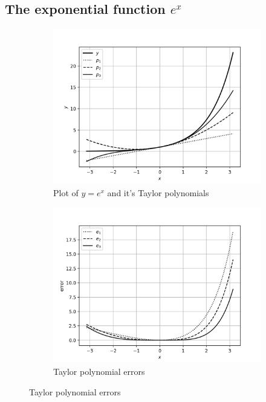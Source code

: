 \documentclass[12,a4paper]{article}
\begin{document}
    \subsection{The exponential function $e^x$}
    \begin{figure}[h!]
        \centering
        \begin{subfigure}[t]{0.49\textwidth}
            \includegraphics[width=\textwidth]{plots/q1p1.png}
            \caption{Plot of $y=e^x$ and it's Taylor polynomials}
            \label{fig:q1a}
        \end{subfigure}
        \begin{subfigure}[t]{0.49\textwidth}
            \includegraphics[width=\textwidth]{plots/q1p2.png}
            \caption{Taylor polynomial errors}
            \label{fig:q1b}
        \end{subfigure}
    \end{figure}
\end{document}
